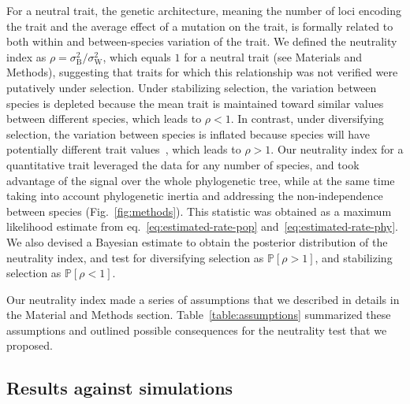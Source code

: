 \documentclass{article}
\newcommand{\proba}{\mathbb{P}}
\newcommand{\RateBetween}{\sigma^2_{\mathrm{B}}}
\newcommand{\RateWhithin}{\sigma^2_{\mathrm{W}}}
\newcommand{\NI}{\rho}
\begin{document}
For a neutral trait, the genetic architecture, meaning the number of loci encoding the trait and the average effect of a mutation on the trait, is formally related to both within and between-species variation of the trait.
We defined the neutrality index as $\NI = \RateBetween/\RateWhithin$, which equals $1$ for a neutral trait (see Materials and Methods), suggesting that traits for which this relationship was not verified were putatively under selection.
Under stabilizing selection, the variation between species is depleted because the mean trait is maintained toward similar values between different species, which leads to $\NI < 1$.
In contrast, under diversifying selection, the variation between species is inflated because species will have potentially different trait values~\citep{hansen_stabilizing_1997}, which leads to $\NI > 1$.
Our neutrality index for a quantitative trait leveraged the data for any number of species, and took advantage of the signal over the whole phylogenetic tree, while at the same time taking into account phylogenetic inertia and addressing the non-independence between species (Fig.~\ref{fig:methods}).
This statistic was obtained as a maximum likelihood estimate from eq.~\ref{eq:estimated-rate-pop} and~\ref{eq:estimated-rate-phy}.
We also devised a Bayesian estimate to obtain the posterior distribution of the neutrality index, and test for diversifying selection as $\proba [\NI > 1]$, and stabilizing selection as $\proba [\NI < 1]$.

Our neutrality index made a series of assumptions that we described in details in the Material and Methods section.
Table~\ref{table:assumptions} summarized these assumptions and outlined possible consequences for the neutrality test that we proposed.

\subsection*{Results against simulations}\label{subsec:results-against-simulations}
\end{document}
